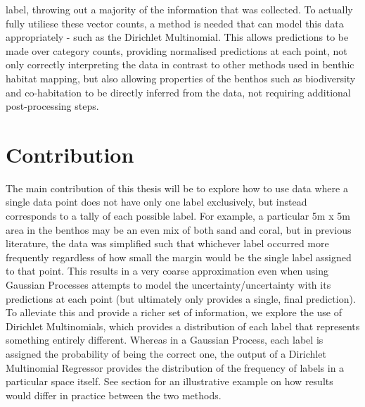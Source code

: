 label, throwing out a majority of the information that was collected. To actually fully utiliese these vector counts, a method is needed that can model this data appropriately - such as the Dirichlet Multinomial. This allows predictions to be made over category counts, providing normalised predictions at each point, not only correctly interpreting the data in contrast to other methods used in benthic habitat mapping, but also allowing properties of the benthos such as biodiversity and co-habitation to be directly inferred from the data, not requiring additional post-processing steps.


\section{Contribution}

 The main contribution of this thesis will be to explore how to use data where a single data point does not have only one label exclusively, but instead corresponds to a tally of each possible label. For example, a particular 5m x 5m area in the benthos may be an even mix of both sand and coral, but in previous literature, the data was simplified such that whichever label occurred more frequently regardless of how small the margin would be the single label assigned to that point. This results in a very coarse approximation even when using Gaussian Processes attempts to model the uncertainty/uncertainty with its predictions at each point (but ultimately only provides a single, final prediction). To alleviate this and provide a richer set of information, we explore the use of Dirichlet Multinomials, which provides a distribution of each label that represents something entirely different. Whereas in a Gaussian Process, each label is assigned the probability of being the correct one, the output of a Dirichlet Multinomial Regressor provides the distribution of the frequency of labels in a particular space itself. See section  for an illustrative example on how results would differ in practice between the two methods.

